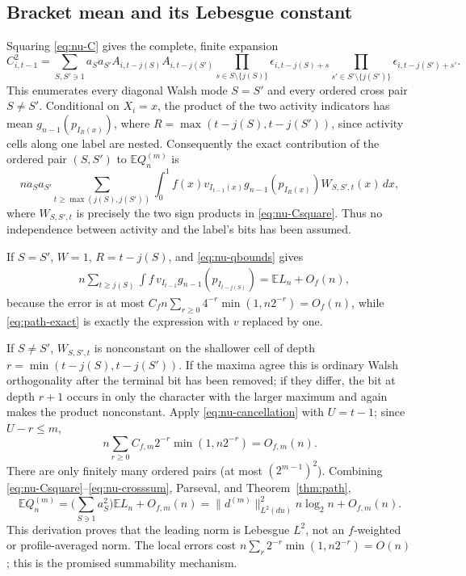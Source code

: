 \documentclass[11pt]{article}
\numberwithin{equation}{section}
\newcommand{\E}{\mathbb E}\newcommand{\Pp}{\mathbb P}
\newcommand{\1}{\mathbf 1}\newcommand{\F}{\mathcal F}\newcommand{\D}{\mathcal D}
\begin{document}
\subsection{Bracket mean and its Lebesgue constant}
Squaring \eqref{eq:nu-C} gives the complete, finite expansion
\begin{equation}\label{eq:nu-Csquare}
 C_{i,t-1}^2=\sum_{S,S'\ni1}a_Sa_{S'}
 A_{i,t-j(S)}A_{i,t-j(S')}
 \prod_{s\in S\setminus\{j(S)\}}\epsilon_{i,t-j(S)+s}
 \prod_{s'\in S'\setminus\{j(S')\}}\epsilon_{i,t-j(S')+s'} . \tag{N.15}
\end{equation}
This enumerates every diagonal Walsh mode $S=S'$ and every ordered cross pair
$S\ne S'$.  Conditional on $X_i=x$, the product of the two activity indicators
has mean $g_{n-1}(p_{I_R(x)})$, where
$R=\max(t-j(S),t-j(S'))$, since activity cells along one label are nested.
Consequently the exact contribution of the ordered pair $(S,S')$ to
$\E Q_n^{(m)}$ is
\begin{equation}\label{eq:nu-pairintegral}
 n a_Sa_{S'}\sum_{t\ge\max(j(S),j(S'))}
 \int_0^1 f(x)v_{I_{t-1}(x)}g_{n-1}(p_{I_R(x)})W_{S,S',t}(x)\,dx, \tag{N.16}
\end{equation}
where $W_{S,S',t}$ is precisely the two sign products in \eqref{eq:nu-Csquare}.
Thus no independence between activity and the label's bits has been assumed.

If $S=S'$, $W=1$, $R=t-j(S)$, and \eqref{eq:nu-qbounds} gives
\begin{align}
 &n\sum_{t\ge j(S)}\int f\,v_{I_{t-1}}g_{n-1}(p_{I_{t-j(S)}})
 =\E L_n+O_f(n),                                             \tag{N.17}
\end{align}
because the error is at most
$C_fn\sum_{r\ge0}4^{-r}\min(1,n2^{-r})=O_f(n)$, while
\eqref{eq:path-exact} is exactly the expression with $v$ replaced by one.

If $S\ne S'$, $W_{S,S',t}$ is nonconstant on the shallower cell of depth
$r=\min(t-j(S),t-j(S'))$.  If the maxima agree this is ordinary Walsh
orthogonality after the terminal bit has been removed; if they differ, the
bit at depth $r+1$ occurs in only the character with the larger maximum and
again makes the product nonconstant.  Apply \eqref{eq:nu-cancellation} with $U=t-1$; since
$U-r\le m$,
\begin{equation}\label{eq:nu-crosssum}
 n\sum_{r\ge0}C_{f,m}2^{-r}\min(1,n2^{-r})=O_{f,m}(n).        \tag{N.18}
\end{equation}
There are only finitely many ordered pairs (at most $(2^{m-1})^2$).  Combining
\eqref{eq:nu-Csquare}--\eqref{eq:nu-crosssum}, Parseval, and
Theorem~\ref{thm:path},
\begin{equation}\label{eq:nu-bracketmean}
 \E Q_n^{(m)}=\Big(\sum_{S\ni1}a_S^2\Big)\E L_n+O_{f,m}(n)
 =\|d^{(m)}\|_{L^2(du)}^2n\log_2n+O_{f,m}(n).                 \tag{N.19}
\end{equation}
This derivation proves that the leading norm is Lebesgue $L^2$, not an
$f$-weighted or profile-averaged norm.  The local errors cost
$n\sum_r2^{-r}\min(1,n2^{-r})=O(n)$; this is the promised summability
mechanism.
\end{document}
